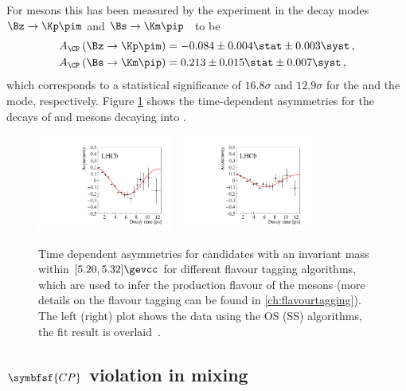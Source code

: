 For \B mesons this has been measured by the \lhcb experiment in the decay modes $\Bz\to\Kp\pim$ and $\Bs\to\Km\pip$~\cite{LHCb-PAPER-2013-018} to be
\begin{equation}
\begin{split}
A_{\CP}\left(\Bz\to\Kp\pim\right) &= -0.084\pm0.004\stat \pm 0.003\syst\,,\\
A_{\CP}\left(\Bs\to\Km\pip\right) &= 0.213\pm0.015\stat \pm 0.007\syst\,,
\end{split}
\end{equation}
which corresponds to a statistical significance of $16.8\sigma$ and $12.9\sigma$ for the \Bz and the \Bs mode, respectively.
Figure \ref{fig:DirectCPV} shows the time-dependent asymmetries for the decays of \Bz and \Bs mesons decaying into \Kp\pim.
\begin{figure}[tbp]
	\centering
	\includegraphics[width=0.4\textwidth]{03CPV/figs/DirectCPV_1.pdf}
	\includegraphics[width=0.4\textwidth]{03CPV/figs/DirectCPV_2.pdf}
	\caption{Time dependent asymmetries for \Kp\pim candidates with an invariant mass within $[5.20, 5.32]\gevcc$ for different flavour tagging algorithms, which are used to infer the production flavour of the \Bq mesons (more details on the flavour tagging can be found in \cref{ch:flavourtagging}). The left (right) plot shows the data using the OS (SS) algorithms, the fit result is overlaid~\cite{LHCb-PAPER-2013-018}.}
	\label{fig:DirectCPV}
\end{figure}

\subsection[head={\CP violation in mixing},tocentry={\CP violation in mixing}]{$\symbfsf{C{}P}$ violation in mixing}
\label{sec:MixingCPV}


